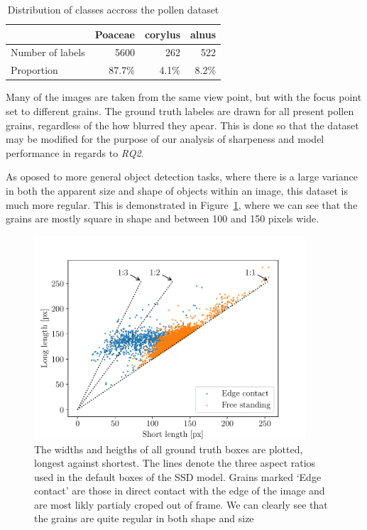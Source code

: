 \begin{table}[htb]
  \caption[Class distribution accross the dataset]{Distribution of classes accross the pollen dataset}\label{tab:dataset}
  \centering 
  \begin{tabular}{lrrr} \toprule
                      & Poaceae & corylus & alnus \\ \midrule
    Number of labels  & 5600    & 262     & 522 \\
    Proportion        & 87.7\%  & 4.1\%   & 8.2\% \\ \bottomrule
  \end{tabular}
\end{table}


Many of the images are taken from the same view point, but with the focus point set to different grains. The ground truth labeles are drawn for all present pollen grains, regardless of the how blurred they apear. This is done so that the dataset may be modified for the purpose of our analysis of sharpeness and model performance in regards to \textit{RQ2}.

As oposed to more general object detection tasks, where there is a large variance in both the apparent size and shape of objects within an image, this dataset is much more regular. This is demonstrated in Figure~\ref{fig:aspect}, where we can see that the grains are mostly square in shape and between 100 and 150 pixels wide.

\begin{figure}[htb]
  \centering
  \includegraphics[width=0.9\textwidth]{figs/aspect_ratio.pdf}
  \caption[Aspect ratios in the dataset]{The widths and heigths of all ground truth boxes are plotted, longest against shortest. The lines denote the three aspect ratios used in the default boxes of the SSD model. Grains marked `Edge contact' are those in direct contact with the edge of the image and are most likly partialy croped out of frame. We can clearly see that the grains are quite regular in both shape and size}\label{fig:aspect}
\end{figure}

